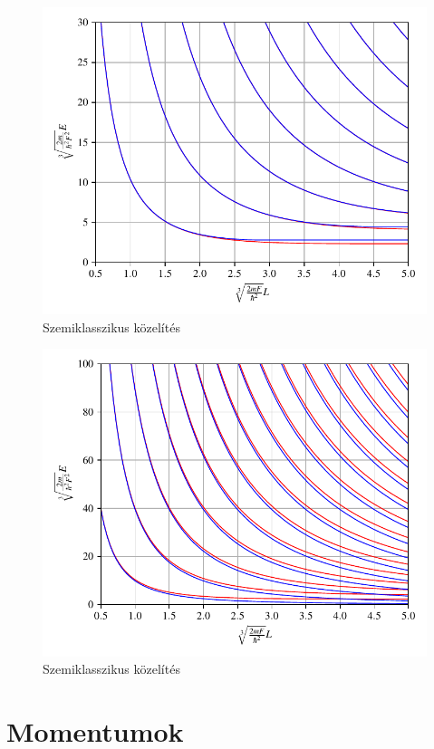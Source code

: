 \documentclass[a4paper,titlepage]{article}
\begin{document}
	\begin{figure}[H]
		\includegraphics[scale=1]{./figs/energiaszintkozelites.pdf}
		\caption{Szemiklasszikus közelítés}
	\end{figure}
	
	\begin{figure}[H]
		\includegraphics[scale=1]{./figs/infsquareenergia.pdf}
		\caption{Szemiklasszikus közelítés}
	\end{figure}

\section{Momentumok}
	
\end{document}
